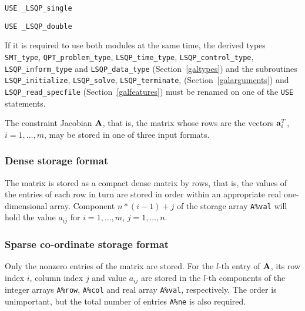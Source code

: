 \documentclass{galahad}
\newcommand{\packagename}{LSQP}
\newcommand{\fullpackagename}{\libraryname\_\-\packagename}
\begin{document}
\medskip{}

\hspace{8mm} {\tt USE \fullpackagename\_single}

\medskip{}

\hspace{8mm} {\tt USE  \fullpackagename\_double}

\medskip

\noindent
If it is required to use both modules at the same time, the derived types 
{\tt SMT\_type}, 
{\tt QPT\_problem\_type}, 
{\tt \packagename\_time\_type}, 
{\tt \packagename\_control\_type}, 
{\tt \packagename\_inform\_type} 
and
{\tt \packagename\_data\_type}
(Section~\ref{galtypes})
and the subroutines
{\tt \packagename\_initialize}, 
{\tt \packagename\_\-solve},
{\tt \packagename\_terminate},
(Section~\ref{galarguments})
and 
{\tt \packagename\_read\_specfile}
(Section~\ref{galfeatures})
must be renamed on one of the {\tt USE} statements.


\galmatrix
The constraint Jacobian ${\mathbf{A}}$, that is, the matrix 
whose rows are the vectors ${\mathbf{a}}_{i}^{T}$, $i = 1, \ldots , m$, 
may be stored in one of three input formats.

\subsubsection{Dense storage format}\label{dense}
The matrix is stored as a compact 
dense matrix by rows, that is, the values of the entries of each row in turn are
stored in order within an appropriate real one-dimensional array.
Component $n \ast (i-1) + j$ of the storage array {\tt A\%val} will hold the 
value $a_{ij}$ for $i = 1, \ldots , m$, $j = 1, \ldots , n$.

\subsubsection{Sparse co-ordinate storage format}\label{coordinate}
Only the nonzero entries of the matrix are stored. For the 
$l$-th entry of ${\mathbf{A}}$, its row index $i$, column index $j$ 
and value $a_{ij}$
are stored in the $l$-th components of the integer arrays {\tt A\%row}, 
{\tt A\%col} and real array {\tt A\%val}, respectively.
The order is unimportant, but the total
number of entries {\tt A\%ne} is also required. 
\end{document}
